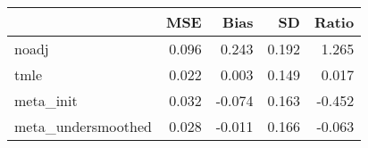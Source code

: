 
\begin{tabular}{lrrrr}
\toprule
  & MSE & Bias & SD & Ratio\\
\midrule
noadj & 0.096 & 0.243 & 0.192 & 1.265\\
tmle & 0.022 & 0.003 & 0.149 & 0.017\\
meta\_init & 0.032 & -0.074 & 0.163 & -0.452\\
meta\_undersmoothed & 0.028 & -0.011 & 0.166 & -0.063\\
\bottomrule
\end{tabular}
